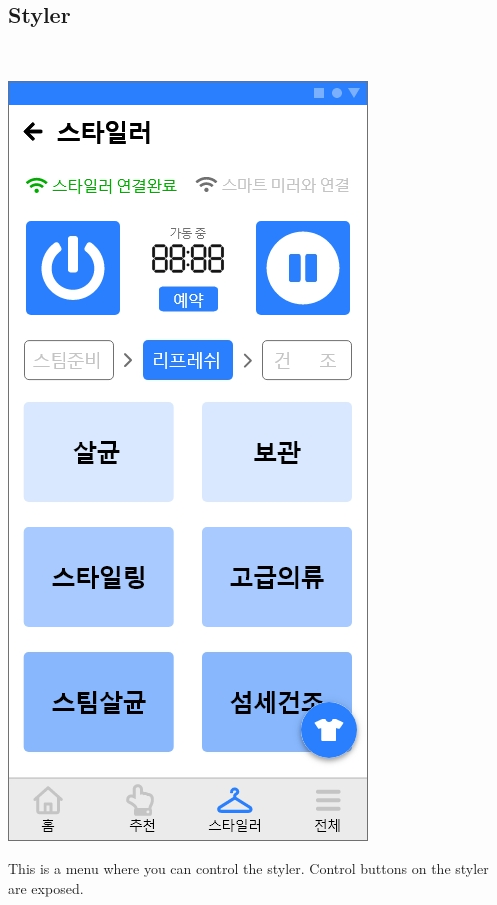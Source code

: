 \documentclass[conference]{IEEEtran}
\begin{document}
\subsection{Styler}  \\ 
\centerline{\includegraphics[scale=0.32]{assets/스타일러4.jpg}}
This is a menu where you can control the styler. Control buttons on the styler are exposed.
\end{document}
